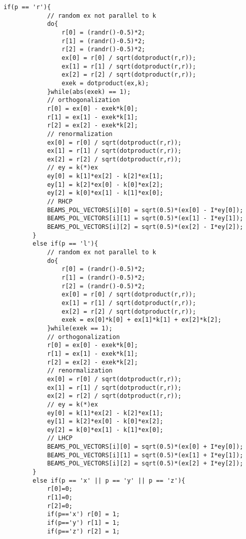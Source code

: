 \begin{lstlisting}[style=CStyle]
        if(p == 'r'){
            // random ex not parallel to k
            do{
                r[0] = (randr()-0.5)*2;
                r[1] = (randr()-0.5)*2;
                r[2] = (randr()-0.5)*2;
                ex[0] = r[0] / sqrt(dotproduct(r,r));
                ex[1] = r[1] / sqrt(dotproduct(r,r));
                ex[2] = r[2] / sqrt(dotproduct(r,r));
                exek = dotproduct(ex,k);
            }while(abs(exek) == 1);
            // orthogonalization
            r[0] = ex[0] - exek*k[0];
            r[1] = ex[1] - exek*k[1];
            r[2] = ex[2] - exek*k[2];
            // renormalization
            ex[0] = r[0] / sqrt(dotproduct(r,r));
            ex[1] = r[1] / sqrt(dotproduct(r,r));
            ex[2] = r[2] / sqrt(dotproduct(r,r));
            // ey = k(*)ex
            ey[0] = k[1]*ex[2] - k[2]*ex[1];
            ey[1] = k[2]*ex[0] - k[0]*ex[2];
            ey[2] = k[0]*ex[1] - k[1]*ex[0];
            // RHCP
            BEAMS_POL_VECTORS[i][0] = sqrt(0.5)*(ex[0] - I*ey[0]);
            BEAMS_POL_VECTORS[i][1] = sqrt(0.5)*(ex[1] - I*ey[1]);
            BEAMS_POL_VECTORS[i][2] = sqrt(0.5)*(ex[2] - I*ey[2]);
        }
        else if(p == 'l'){
            // random ex not parallel to k
            do{
                r[0] = (randr()-0.5)*2;
                r[1] = (randr()-0.5)*2;
                r[2] = (randr()-0.5)*2;
                ex[0] = r[0] / sqrt(dotproduct(r,r));
                ex[1] = r[1] / sqrt(dotproduct(r,r));
                ex[2] = r[2] / sqrt(dotproduct(r,r));
                exek = ex[0]*k[0] + ex[1]*k[1] + ex[2]*k[2];
            }while(exek == 1);
            // orthogonalization
            r[0] = ex[0] - exek*k[0];
            r[1] = ex[1] - exek*k[1];
            r[2] = ex[2] - exek*k[2];
            // renormalization
            ex[0] = r[0] / sqrt(dotproduct(r,r));
            ex[1] = r[1] / sqrt(dotproduct(r,r));
            ex[2] = r[2] / sqrt(dotproduct(r,r));
            // ey = k(*)ex
            ey[0] = k[1]*ex[2] - k[2]*ex[1];
            ey[1] = k[2]*ex[0] - k[0]*ex[2];
            ey[2] = k[0]*ex[1] - k[1]*ex[0];
            // LHCP
            BEAMS_POL_VECTORS[i][0] = sqrt(0.5)*(ex[0] + I*ey[0]);
            BEAMS_POL_VECTORS[i][1] = sqrt(0.5)*(ex[1] + I*ey[1]);
            BEAMS_POL_VECTORS[i][2] = sqrt(0.5)*(ex[2] + I*ey[2]);
        }
        else if(p == 'x' || p == 'y' || p == 'z'){
            r[0]=0;
            r[1]=0;
            r[2]=0;
            if(p=='x') r[0] = 1;
            if(p=='y') r[1] = 1;
            if(p=='z') r[2] = 1;


\end{lstlisting}

